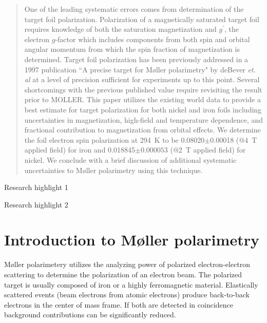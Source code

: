 \documentclass[preprint,12pt]{elsarticle}
\begin{document}
\begin{frontmatter}
\begin{abstract}
One of the leading systematic errors comes from determination of the target foil polarization. Polarization of a magnetically saturated target foil requires knowledge of both the saturation magnetization and $g^\prime$, the electron $g$-factor which includes components from both spin and  orbital angular momentum from which the spin fraction of magnetization is determined. Target foil polarization has been previously addressed in a 1997 publication ``A precise target for M\o ller polarimetry" by deBever {\it et. al} \cite{deBever1997} at a level of precision sufficient for experiments up to this point. Several shortcomings with the previous published value require revisiting the result prior to MOLLER. This paper utilizes the existing world data to provide a best estimate for target polarization for both nickel and iron foils including uncertainties in magnetization, high-field and temperature dependence, and fractional contribution to magnetization from orbital effects. We determine the foil electron spin polarization at 294~K to be 0.08020$\pm$0.00018 (@4~T applied field) for iron and 0.018845$\pm0.000053$ (@2~T applied field) for nickel. We conclude with a brief discussion of additional systematic uncertainties to M\o ller polarimetry using this technique.
\end{abstract}


\begin{highlights}
\item Research highlight 1
\item Research highlight 2
\end{highlights}

\begin{keyword}



\end{keyword}

\end{frontmatter}


\section{Introduction to M\o ller polarimetry}
M\o ller polarimetery utilizes the analyzing power of polarized electron-electron scattering to determine the polarization of an electron beam. The polarized target is usually composed of iron or a highly ferromagnetic material. Elastically scattered events (beam electrons from atomic electrons) produce back-to-back electrons in the center of mass frame. If both are detected in coincidence background contributions can be significantly reduced.
\end{document}
